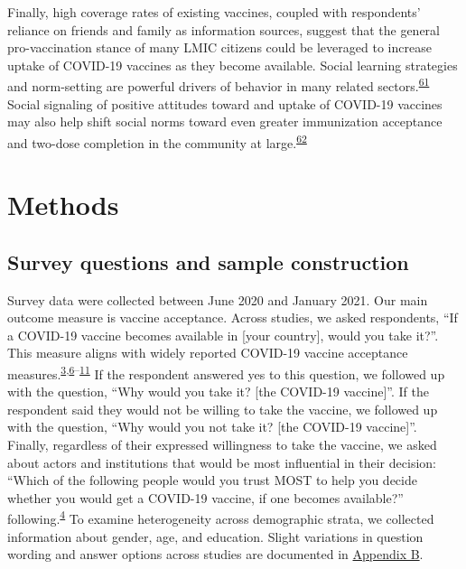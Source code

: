 \documentclass[
  12pt,
]{article}
\begin{document}
Finally, high coverage rates of existing vaccines, coupled with respondents' reliance on friends and family as information sources, suggest that the general pro-vaccination stance of many LMIC citizens could be leveraged to increase uptake of COVID-19 vaccines as they become available. Social learning strategies and norm-setting are powerful drivers of behavior in many related sectors.\textsuperscript{\protect\hyperlink{ref-beaman2021can}{61}} Social signaling of positive attitudes toward and uptake of COVID-19 vaccines may also help shift social norms toward even greater immunization acceptance and two-dose completion in the community at large.\textsuperscript{\protect\hyperlink{ref-karing2018social}{62}}

\hypertarget{methods}{%
\section*{Methods}\label{methods}}

\hypertarget{survey-questions-and-sample-construction}{%
\subsection*{Survey questions and sample construction}\label{survey-questions-and-sample-construction}}

Survey data were collected between June 2020 and January 2021. Our main outcome measure is vaccine acceptance. Across studies, we asked respondents, ``If a COVID-19 vaccine becomes available in {[}your country{]}, would you take it?''. This measure aligns with widely reported COVID-19 vaccine acceptance measures.\textsuperscript{\protect\hyperlink{ref-wouters2021challenges}{3},\protect\hyperlink{ref-Malik2020}{6}--\protect\hyperlink{ref-lazarus2020nature}{11}} If the respondent answered yes to this question, we followed up with the question, ``Why would you take it? {[}the COVID-19 vaccine{]}''. If the respondent said they would not be willing to take the vaccine, we followed up with the question, ``Why would you not take it? {[}the COVID-19 vaccine{]}''. Finally, regardless of their expressed willingness to take the vaccine, we asked about actors and institutions that would be most influential in their decision: ``Which of the following people would you trust MOST to help you decide whether you would get a COVID-19 vaccine, if one becomes available?'' following.\textsuperscript{\protect\hyperlink{ref-defigueiredo2020lancet}{4}} To examine heterogeneity across demographic strata, we collected information about gender, age, and education. Slight variations in question wording and answer options across studies are documented in \protect\hyperlink{appendixb}{Appendix B}.
\end{document}
